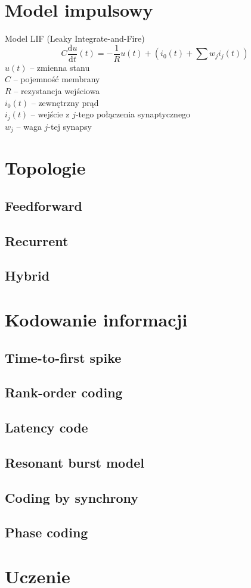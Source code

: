 \documentclass{beamer}
\begin{document}
\section{Model impulsowy}
\begin{frame}
  \begin{block}{Model LIF (Leaky Integrate-and-Fire)}
    $$ C\frac{\mathrm{d}u}{\mathrm{d}t} (t) = -\frac1Ru(t)+\left(i_0(t) + \sum{w_ji_j(t)}\right)$$ 
    $u(t)$ -- zmienna stanu \\ 
    $C$ -- pojemność membrany \\
    $R$ -- rezystancja wejściowa\\
    $i_0(t)$ -- zewnętrzny prąd \\
    $i_j(t)$ -- wejście z $j$-tego połączenia synaptycznego\\
    $w_j$ -- waga $j$-tej synapsy
  \end{block}
\end{frame}
\section{Topologie}
\subsection{Feedforward}
\subsection{Recurrent}
\subsection{Hybrid}

\begin{frame}
\end{frame}
\section{Kodowanie informacji}
\subsection{ Time-to-first spike}
\begin{frame}
\end{frame}
\subsection{ Rank-order coding}
\subsection{ Latency code}
\subsection{ Resonant burst model}
\subsection{ Coding by synchrony}
\subsection{ Phase coding}

\section{Uczenie}
\end{document}
